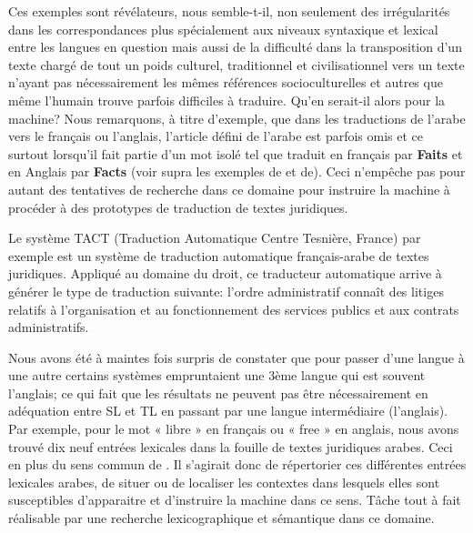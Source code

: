 \documentclass[french]{textolivre}
\begin{document}
Ces exemples sont révélateurs, nous semble-t-il, non seulement des irrégularités dans les correspondances plus spécialement aux niveaux syntaxique et lexical entre les langues en question mais aussi de la difficulté dans la transposition d’un texte chargé de tout un poids culturel, traditionnel et civilisationnel vers un texte n’ayant pas nécessairement les mêmes références socioculturelles et autres que même l’humain trouve parfois difficiles à traduire. Qu’en serait-il alors pour la machine? Nous remarquons, à titre d’exemple, que dans les traductions de l’arabe vers le français ou l’anglais, l’article défini de l’arabe est parfois omis et ce surtout lorsqu’il fait partie d’un mot isolé tel que  traduit en français par \textbf{Faits} et en Anglais par \textbf{Facts} (voir supra les exemples de  et de). Ceci n’empêche pas pour autant des tentatives de recherche dans ce domaine pour instruire la machine à procéder à des prototypes de traduction de textes juridiques.

Le système TACT (Traduction Automatique Centre Tesnière, France) par exemple est un système de traduction automatique français-arabe \cite{alsharaf2004} de textes juridiques. Appliqué au domaine du droit, ce traducteur automatique arrive à générer le type de traduction suivante: l'ordre administratif connaît des litiges relatifs à l'organisation et au fonctionnement des services publics et aux contrats administratifs.

\begin{quote}

\end{quote}


Nous avons été à maintes fois surpris de constater que pour passer d’une langue à une autre certains systèmes empruntaient une 3ème langue qui est souvent l’anglais; ce qui fait que les résultats ne peuvent pas être nécessairement en adéquation entre SL et TL en passant par une langue intermédiaire (l’anglais). Par exemple, pour le mot « libre » en français ou « free » en anglais, nous avons trouvé dix neuf entrées lexicales dans la fouille de textes juridiques arabes. Ceci en plus du sens commun de . Il s’agirait donc de répertorier ces différentes entrées lexicales arabes, de situer ou de localiser les contextes dans lesquels elles sont susceptibles d’apparaitre et d’instruire la machine dans ce sens. Tâche tout à fait réalisable par une recherche lexicographique et sémantique dans ce domaine.
\end{document}
